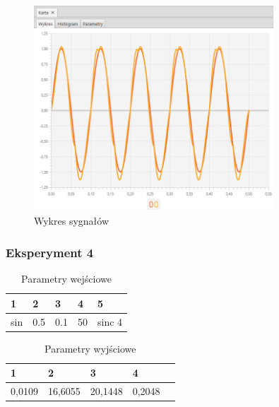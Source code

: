 \documentclass[12pt]{article}
\begin{document}
{{{                \begin{figure}[H]
                    \centering
                    \includegraphics[width=0.8\textwidth]{img/result/experiment4/03/data_draw_original_chart_recon_output_130607.png}
                    \caption{Wykres sygnałów}
                \end{figure}
            }
            \newpage

            \subsubsection{Eksperyment 4} {
                \begin{table}[H]
                    \centering
                    \begin{tabular}{|l|l|l|l|l|}
                        \hline
                        1 & 2 & 3 & 4 & 5   \\ \hline
                        sin & 0.5 & 0.1 & 50 & sinc 4  \\ \hline
                    \end{tabular}
                    \caption{Parametry wejściowe}
                \end{table}

                \begin{table}[H]
                    \centering
                    \begin{tabular}{|l|l|l|l|l|}
                        \hline
                        1 & 2 & 3 & 4   \\ \hline
                        0,0109 & 16,6055 & 20,1448 & 0,2048 \\ \hline
                    \end{tabular}
                    \caption{Parametry wyjściowe}
                \end{table}


}}}
\end{document}

